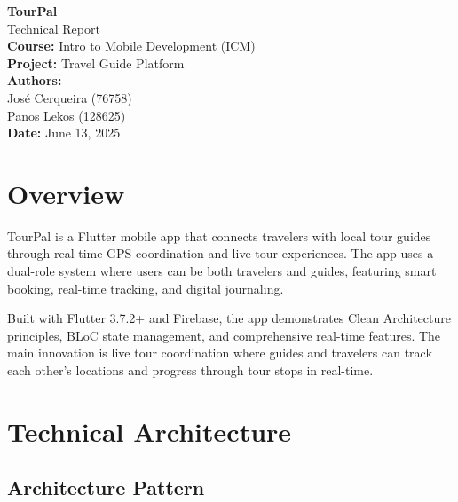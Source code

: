 \documentclass[12pt,a4paper]{article}
\begin{document}
\begin{titlepage}
    \centering
    \vspace*{2cm}
    
    {\Huge\bfseries\color{tourpalblue} TourPal}\\[0.5cm]
    {\Large Technical Report}\\[2cm]
    
    {\large\bfseries Course:} Intro to Mobile Development (ICM)\\[0.5cm]
    {\large\bfseries Project:} Travel Guide Platform\\[2cm]
    
    {\large\bfseries Authors:}\\[0.5cm]
    José Cerqueira (76758)\\
    Panos Lekos (128625)\\[2cm]
    
    {\large\bfseries Date:} June 13, 2025\\[2cm]
    
    \vfill
    
\end{titlepage}

\tableofcontents
\newpage

\section{Overview}

TourPal is a Flutter mobile app that connects travelers with local tour guides through real-time GPS coordination and live tour experiences. The app uses a dual-role system where users can be both travelers and guides, featuring smart booking, real-time tracking, and digital journaling.

Built with Flutter 3.7.2+ and Firebase, the app demonstrates Clean Architecture principles, BLoC state management, and comprehensive real-time features. The main innovation is live tour coordination where guides and travelers can track each other's locations and progress through tour stops in real-time.

\section{Technical Architecture}

\subsection{Architecture Pattern}
\end{document}
